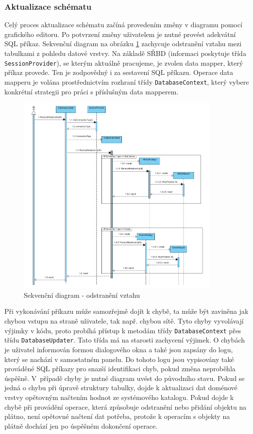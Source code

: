 \documentclass[czech,bachelor,public,dept460,male,oneside]{diploma}
\begin{document}
		\subsubsection{Aktualizace schématu} \label{secDbUpdate}
		Celý proces aktualizace schématu začíná provedením změny v diagramu pomocí grafického editoru. Po potvrzení změny uživatelem je nutné provést adekvátní SQL příkaz. Sekvenční diagram na obrázku \ref{fig:seqRemoveFk} zachycuje odstranění vztahu mezi tabulkami z pohledu datové vrstvy. Na základě SŘBD (informaci poskytuje třída \texttt{SessionProvider}), se kterým aktuálně pracujeme, je zvolen data mapper, který příkaz provede. Ten je zodpovědný i za sestavení SQL příkazu. Operace data mapperu je volána prostřednictvím rozhraní třídy \texttt{DatabaseContext}, který vybere konkrétní strategii pro práci s příslušným data mapperem. 
		
		\begin{figure}[H]
			\centering
			\includegraphics[width=0.9\textwidth]{Figures/SequenceRemoveFk}
			\caption{Sekvenční diagram - odstranění vztahu}
			\label{fig:seqRemoveFk}
		\end{figure}
		
		Při vykonávání příkazu může samozřejmě dojít k chybě, ta může být zaviněna jak chybou vstupu na straně uživatele, tak např. chybou sítě. Tyto chyby vyvolávají výjimky v kódu, proto probíhá přístup k metodám třídy \texttt{DatabaseContext} přes třídu \texttt{DatabaseUpdater}. Tato třída má na starosti zachycení výjimek. O chybách je uživatel informován formou dialogového okna a také jsou zapsány do logu, který se nachází v samostatném panelu. Do tohoto logu jsou vypisovány také prováděné SQL příkazy pro snazší identifikaci chyb, pokud změna neproběhla úspěšně. V~případě chyby je nutné diagram uvést do původního stavu. Pokud se jedná o chybu při úpravě struktury tabulky, dojde k aktualizaci dat doménové vrstvy opětovným načtením hodnot ze systémového katalogu. Pokud dojde k chybě při provádění operace, která způsobuje odstranění nebo přidání objektu na plátno, není opětovné načtení dat potřeba, protože k operacím s objekty na plátně dochází jen po úspěšném dokončení operace.
	
\end{document}
